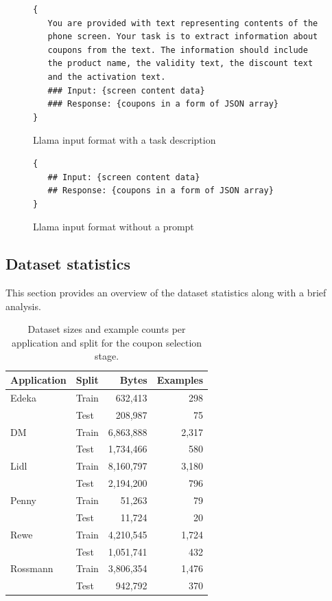 \documentclass[licencjacka,en]{pracamgr}
\begin{document}
\begin{figure}[ht]
\centering
\begin{tcolorbox}[sharp corners, boxrule=0.5mm, colframe=black, colback=white, coltitle=black, width=0.9\textwidth] 
\begin{BVerbatim}
{
   You are provided with text representing contents of the 
   phone screen. Your task is to extract information about 
   coupons from the text. The information should include 
   the product name, the validity text, the discount text 
   and the activation text.       
   ### Input: {screen content data}
   ### Response: {coupons in a form of JSON array}
}
\end{BVerbatim}
\end{tcolorbox}
\caption{Llama input format with a task description}
\label{fig:llama_ds_w}
\end{figure}

\begin{figure}[ht]
\centering
\begin{tcolorbox}[sharp corners, boxrule=0.5mm, colframe=black, colback=white, coltitle=black, width=0.9\textwidth] 
\begin{BVerbatim}
{
   ## Input: {screen content data}
   ## Response: {coupons in a form of JSON array}
}
\end{BVerbatim}
\end{tcolorbox}
\caption{Llama input format without a prompt}
\label{fig:llama_ds_wth}
\end{figure}

\subsection{Dataset statistics}
This section provides an overview of the dataset statistics along with a brief analysis.

\begin{table}[h!]
\centering
\begin{tabular}{|l|l|r|r|}
\hline
\textbf{Application} & \textbf{Split} & \textbf{Bytes} & \textbf{Examples} \\
\hline
Edeka     & Train & 632,413  & 298 \\
          & Test  & 208,987  & 75 \\
DM        & Train & 6,863,888 & 2,317 \\
          & Test  & 1,734,466 & 580 \\
Lidl      & Train & 8,160,797 & 3,180 \\
          & Test  & 2,194,200 & 796 \\
Penny     & Train & 51,263   & 79 \\
          & Test  & 11,724   & 20 \\
Rewe      & Train & 4,210,545 & 1,724 \\
          & Test  & 1,051,741 & 432 \\
Rossmann  & Train & 3,806,354 & 1,476 \\
          & Test  & 942,792  & 370 \\
\hline
\end{tabular}
\caption{Dataset sizes and example counts per application and split for the coupon selection stage.}
\end{table}
\end{document}
